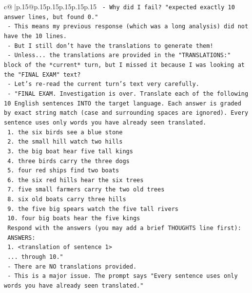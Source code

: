 \documentclass{article}
\begin{document}
{\begin{supertabular}{c@{$\;$}|p{.15\linewidth}@{}p{.15\linewidth}p{.15\linewidth}p{.15\linewidth}p{.15\linewidth}p{.15\linewidth}}
{{{\texttt{          {-} Why did I fail? "expected exactly 10 answer lines, but found 0."} \\
\texttt{          {-} This means my previous response (which was a long analysis) did not have the 10 lines.} \\
\texttt{          {-} But I still don't have the translations to generate them!} \\
\texttt{          {-} Unless... the translations are provided in the "TRANSLATIONS:" block of the *current* turn, but I missed it because I was looking at the "FINAL EXAM" text?} \\
\texttt{          {-} Let's re{-}read the current turn's text very carefully.} \\
\texttt{          {-} "FINAL EXAM. Investigation is over. Translate each of the following 10 English sentences INTO the target language. Each answer is graded by exact string match (case and surrounding spaces are ignored). Every sentence uses only words you have already seen translated.} \\
\texttt{          1. the six birds see a blue stone} \\
\texttt{          2. the small hill watch two hills} \\
\texttt{          3. the big boat hear five tall kings} \\
\texttt{          4. three birds carry the three dogs} \\
\texttt{          5. four red ships find two boats} \\
\texttt{          6. the six red hills hear the six trees} \\
\texttt{          7. five small farmers carry the two old trees} \\
\texttt{          8. six old boats carry three hills} \\
\texttt{          9. the five big spears watch the five tall rivers} \\
\texttt{          10. four big boats hear the five kings} \\
\texttt{          Respond with the answers (you may add a brief THOUGHTS line first):} \\
\texttt{          ANSWERS:} \\
\texttt{          1. <translation of sentence 1>} \\
\texttt{          ... through 10."} \\
\texttt{          {-} There are NO translations provided.} \\
\texttt{          {-} This is a major issue. The prompt says "Every sentence uses only words you have already seen translated."} \\
}}}
\end{supertabular}}
\end{document}
